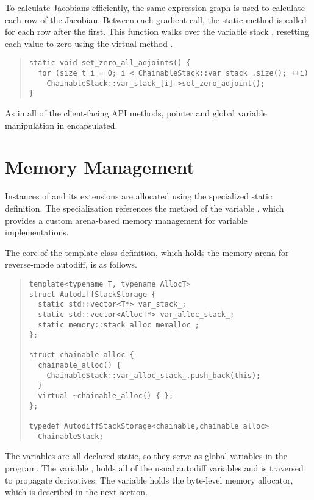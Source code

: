 \documentclass[10pt]{article}
\begin{document}
To calculate Jacobians efficiently, the same expression graph is used
to calculate each row of the Jacobian.  Between each gradient call,
the static method  is called for
each row after the first.  This function walks over the variable stack
, resetting each value to zero using
the virtual method .
%
\begin{quote}
\begin{Verbatim}
static void set_zero_all_adjoints() {
  for (size_t i = 0; i < ChainableStack::var_stack_.size(); ++i)
    ChainableStack::var_stack_[i]->set_zero_adjoint();
}
\end{Verbatim}
\end{quote}
%
As in all of the client-facing API methods, pointer and global
variable manipulation in encapsulated.



\section{Memory Management}

Instances of  and its extensions are allocated using the
specialized static ~ definition.  The specialization
references the  method of the variable
, which provides a custom arena-based
memory management for variable implementations.


The core of the  template class
definition, which holds the memory arena for reverse-mode autodiff, is
as follows.
%
\begin{quote}
\begin{Verbatim}
template<typename T, typename AllocT>
struct AutodiffStackStorage {
  static std::vector<T*> var_stack_;
  static std::vector<AllocT*> var_alloc_stack_;
  static memory::stack_alloc memalloc_;
};

struct chainable_alloc {
  chainable_alloc() {
    ChainableStack::var_alloc_stack_.push_back(this);
  }
  virtual ~chainable_alloc() { };
};

typedef AutodiffStackStorage<chainable,chainable_alloc>
  ChainableStack;
\end{Verbatim}
\end{quote}
%
The variables are all declared static, so they serve as global
variables in the program.  The variable , holds all
of the usual autodiff variables and is traversed to propagate
derivatives.  The variable  holds the byte-level
memory allocator, which is described in the next section.  
\end{document}
